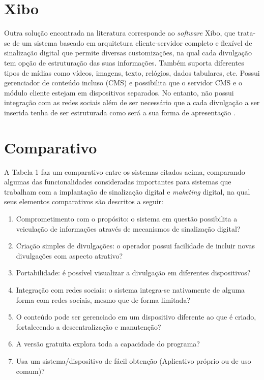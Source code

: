 \section{Xibo}
Outra solução encontrada na literatura corresponde ao \textit{software} Xibo, que trata-se de um sistema baseado em arquitetura cliente-servidor completo e flexível de sinalização digital que permite diversas customizações, na qual cada divulgação tem opção de estruturação das suas informações. Também suporta diferentes tipos de mídias como vídeos, imagens, texto, relógios, dados tabulares, etc. Possui gerenciador de conteúdo incluso (CMS) e possibilita que o servidor CMS e o módulo cliente estejam em dispositivos separados. No entanto, não possui integração com as redes sociais além de ser necessário que a cada divulgação a ser inserida tenha de ser estruturada como será a sua forma de apresentação \cite{xibo2017}.

\section{Comparativo}
A Tabela 1 faz um comparativo entre os sistemas citados acima, comparando algumas das funcionalidades consideradas importantes para sistemas que trabalham com a implantação de sinalização digital e \textit{maketing} digital, na qual seus elementos comparativos são descritos a seguir:
\begin{enumerate}[label=\Roman*)]
	\item Comprometimento com o propósito: o sistema em questão possibilita a veiculação de informações através de mecanismos de sinalização digital?
	\item Criação simples de divulgações: o operador possui facilidade de incluir novas divulgações com aspecto atrativo?
	\item Portabilidade: é possível visualizar a divulgação em diferentes dispositivos?
	\item Integração com redes sociais: o sistema integra-se nativamente de alguma forma com redes sociais, mesmo que de forma limitada?
	\item O conteúdo pode ser gerenciado em um dispositivo diferente ao que é criado, fortalecendo a descentralização e manutenção?
	\item A versão gratuita explora toda a capacidade do programa?
	\item Usa um sistema/dispositivo de fácil obtenção (Aplicativo próprio ou de uso comum)?
\end{enumerate}

